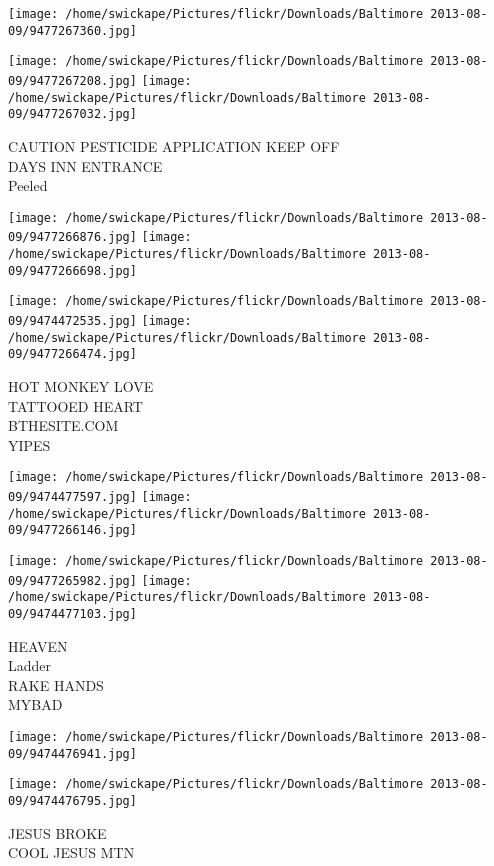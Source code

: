 \documentclass[10pt,letterpaper]{article}
\begin{document}
\texttt{[image: /home/swickape/Pictures/flickr/Downloads/Baltimore 2013-08-09/9477267360.jpg]}

\vspace{0.25in}
\texttt{[image: /home/swickape/Pictures/flickr/Downloads/Baltimore 2013-08-09/9477267208.jpg]}
\texttt{[image: /home/swickape/Pictures/flickr/Downloads/Baltimore 2013-08-09/9477267032.jpg]}

CAUTION PESTICIDE APPLICATION KEEP OFF\\
DAYS INN ENTRANCE\\
Peeled
\pagebreak

\texttt{[image: /home/swickape/Pictures/flickr/Downloads/Baltimore 2013-08-09/9477266876.jpg]}
\texttt{[image: /home/swickape/Pictures/flickr/Downloads/Baltimore 2013-08-09/9477266698.jpg]}

\texttt{[image: /home/swickape/Pictures/flickr/Downloads/Baltimore 2013-08-09/9474472535.jpg]}
\texttt{[image: /home/swickape/Pictures/flickr/Downloads/Baltimore 2013-08-09/9477266474.jpg]}

HOT MONKEY LOVE\\
TATTOOED HEART\\
BTHESITE.COM\\
YIPES
\pagebreak

\texttt{[image: /home/swickape/Pictures/flickr/Downloads/Baltimore 2013-08-09/9474477597.jpg]}
\texttt{[image: /home/swickape/Pictures/flickr/Downloads/Baltimore 2013-08-09/9477266146.jpg]}

\texttt{[image: /home/swickape/Pictures/flickr/Downloads/Baltimore 2013-08-09/9477265982.jpg]}
\texttt{[image: /home/swickape/Pictures/flickr/Downloads/Baltimore 2013-08-09/9474477103.jpg]}

HEAVEN\\
Ladder\\
RAKE HANDS\\
MYBAD
\pagebreak

\texttt{[image: /home/swickape/Pictures/flickr/Downloads/Baltimore 2013-08-09/9474476941.jpg]}

\vspace{0.25in}
\texttt{[image: /home/swickape/Pictures/flickr/Downloads/Baltimore 2013-08-09/9474476795.jpg]}

JESUS BROKE\\
COOL JESUS MTN
\pagebreak
\end{document}
